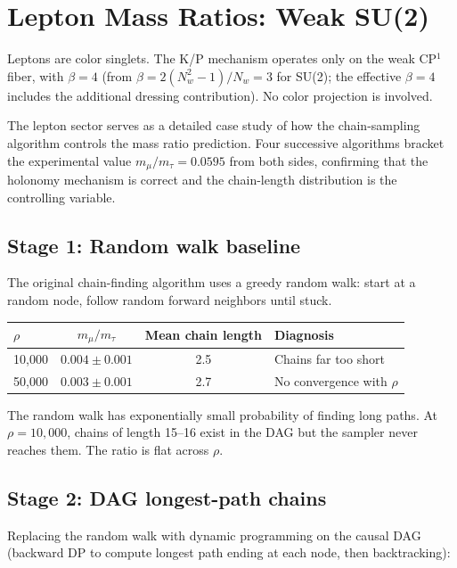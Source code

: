 \documentclass[11pt,letterpaper]{article}
\begin{document}
\section{Lepton Mass Ratios: Weak SU(2)}

Leptons are color singlets. The K/P mechanism operates only on the
weak CP$^1$ fiber, with $\beta = 4$ (from $\beta = 2(N_w^2 - 1)/N_w
= 3$ for SU(2); the effective $\beta = 4$ includes the additional
dressing contribution). No color projection is involved.

The lepton sector serves as a detailed case study of how the
chain-sampling algorithm controls the mass ratio prediction. Four
successive algorithms bracket the experimental value $m_\mu/m_\tau
= 0.0595$ from both sides, confirming that the holonomy mechanism is
correct and the chain-length distribution is the controlling variable.

\subsection{Stage 1: Random walk baseline}

The original chain-finding algorithm uses a greedy random walk: start
at a random node, follow random forward neighbors until stuck.

\begin{center}
\begin{tabular}{@{}lccl@{}}
\toprule
$\rho$ & $m_\mu/m_\tau$ & Mean chain length & Diagnosis \\
\midrule
10{,}000 & $0.004 \pm 0.001$ & 2.5 & Chains far too short \\
50{,}000 & $0.003 \pm 0.001$ & 2.7 & No convergence with $\rho$ \\
\bottomrule
\end{tabular}
\end{center}

\noindent The random walk has exponentially small probability of finding
long paths. At $\rho = 10{,}000$, chains of length 15--16 exist in the
DAG but the sampler never reaches them. The ratio is flat across $\rho$.

\subsection{Stage 2: DAG longest-path chains}

Replacing the random walk with dynamic programming on the causal DAG
(backward DP to compute longest path ending at each node, then
backtracking):
\end{document}
